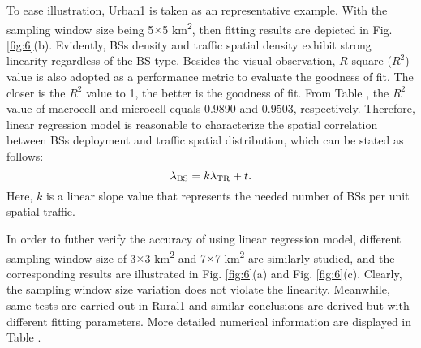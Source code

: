 To ease illustration, Urban1 is taken as an representative example. With the sampling window size being 5${\times}$5 km\textsuperscript{2}, then fitting results are depicted in Fig. \ref{fig:6}(b). Evidently, BSs density and traffic spatial density exhibit strong linearity regardless of the BS type. Besides the visual observation, ${R}$-square (${R^2}$) value is also adopted as a performance metric to evaluate the goodness of fit. The closer is the ${R^2}$ value to 1, the better is the goodness of fit. From Table \uppercase\expandafter{}, the ${R^2} $ value of macrocell and microcell equals 0.9890 and 0.9503, respectively. Therefore, linear regression model is reasonable to characterize the spatial correlation between BSs deployment and traffic spatial distribution, which can be stated as follows:
\begin{equation}
{\lambda_{\rm{BS}}} = {{k}{\lambda_{\rm{TR}}+{t}}}.
\end{equation}
Here, ${k}$ is a linear slope value that represents the needed number of BSs per unit spatial traffic.
\begin{figure*}
	\centering
	\hspace{6pt}
	\hspace{6pt}
	\caption{The fitting results of Urban1, when sampling window size varies.}
	\label{fig:6}
\end{figure*}

In order to futher verify the accuracy of using linear regression model, different sampling window size of 3${\times}$3 km\textsuperscript{2} and 7${\times}$7 km\textsuperscript{2} are similarly studied, and the corresponding results are illustrated in Fig. \ref{fig:6}(a) and Fig. \ref{fig:6}(c). Clearly, the sampling window size variation does not violate the linearity. Meanwhile, same tests are carried out in Rural1 and similar conclusions are derived but with different fitting parameters. More detailed numerical information are displayed in Table \uppercase\expandafter{}.

